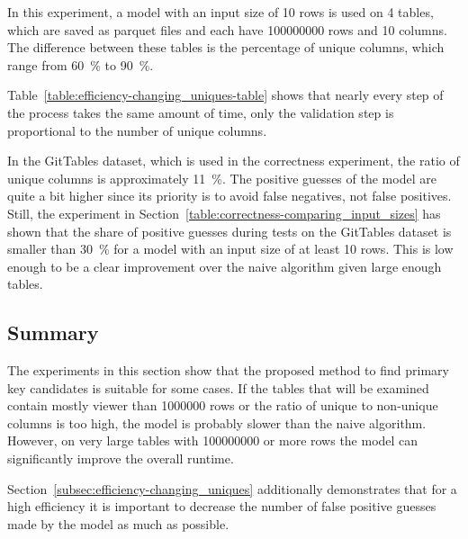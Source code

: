 In this experiment, a model with an input size of \num{10} rows is used on \num{4} tables, which are saved as parquet files and each have \num{100000000} rows and \num{10} columns. The difference between these tables is the percentage of unique columns, which range from \SI{60}{\percent} to \SI{90}{\percent}.

Table~\ref{table:efficiency-changing_uniques-table} shows that nearly every step of the process takes the same amount of time, only the validation step is proportional to the number of unique columns.

In the GitTables dataset, which is used in the correctness experiment, the ratio of unique columns is approximately \SI{11}{\percent}. The positive guesses of the model are quite a bit higher since its priority is to avoid false negatives, not false positives. Still, the experiment in Section~\ref{table:correctness-comparing_input_sizes} has shown that the share of positive guesses during tests on the GitTables dataset is smaller than \SI{30}{\percent} for a model with an input size of at least \num{10} rows. This is low enough to be a clear improvement over the naive algorithm given large enough tables.



\subsection{Summary}\label{subsec:efficiency-summary}
The experiments in this section show that the proposed method to find primary key candidates is suitable for some cases. If the tables that will be examined contain mostly viewer than \num{1000000} rows or the ratio of unique to non-unique columns is too high, the model is probably slower than the naive algorithm. However, on very large tables with \num{100000000} or more rows the model can significantly improve the overall runtime. %

Section~\ref{subsec:efficiency-changing_uniques} additionally demonstrates that for a high efficiency it is important to decrease the number of false positive guesses made by the model as much as possible.
